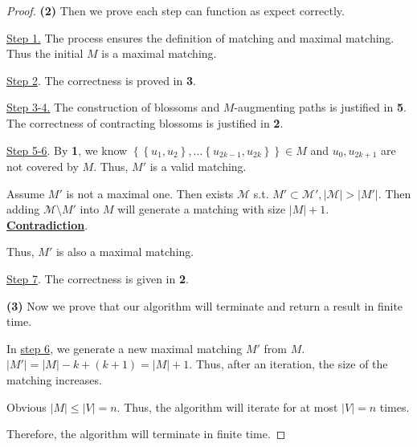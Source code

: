 \documentclass{article}
\newcommand{\set}[1]{\left\{#1\right\}}
\begin{document}
\begin{proof}
    \vspace{1em} \hspace{1.3em}
    \textbf{(2)} 
    Then we prove each step can function as expect correctly.
    
    \hspace{1.3em}
    \underline{Step 1.} The process ensures the definition of matching and maximal matching. Thus the initial $M$ is a maximal matching.
    
    \hspace{1.3em}
    \underline{Step 2}. The correctness is proved in \textbf{3}.
    
    \hspace{1.3em}
    \underline{Step 3-4.} The construction of blossoms and $M$-augmenting paths is justified in \textbf{5}. The correctness of contracting blossoms is justified in \textbf{2}.
    
    \hspace{1.3em}
    \underline{Step 5-6}. By \textbf{1}, we know $\set{\set{u_1,u_2},...\set{u_{2k-1},u_{2k}}}\in M$ and $u_0,u_{2k+1}$ are not covered by $M$. Thus, $M'$ is a valid matching.
    
    \hspace{1.3em}
    Assume $M'$ is not a maximal one. Then exists $\mathcal{M}$ s.t. $M'\subset\mathcal{M}', |\mathcal{M}|>|M'|$. Then adding $\mathcal{M}\setminus M'$ into $M$ will generate a matching with size $|M|+1$. \underline{\textbf{Contradiction}}.
    
    \hspace{1.3em}
    Thus, $M'$ is also a maximal matching.
    
    \hspace{1.3em}
    \underline{Step 7}. The correctness is given in \textbf{2}.
    
    \vspace{1em} \hspace{1.3em}
    \textbf{(3)} Now we prove that our algorithm will terminate and return a result in finite time. 
    
    \hspace{1.3em}
    In \underline{step 6}, we generate a new maximal matching $M'$ from $M$. $|M'|=|M|-k+(k+1)=|M|+1.$ Thus, after an iteration, the size of the matching increases.
    
    \hspace{1.3em}
    Obvious $|M|\le|V|=n$. Thus, the algorithm will iterate for at most $|V|=n$ times.
    
    \hspace{1.3em}
    Therefore, the algorithm will terminate in finite time. 
    

\end{proof}
\end{document}
